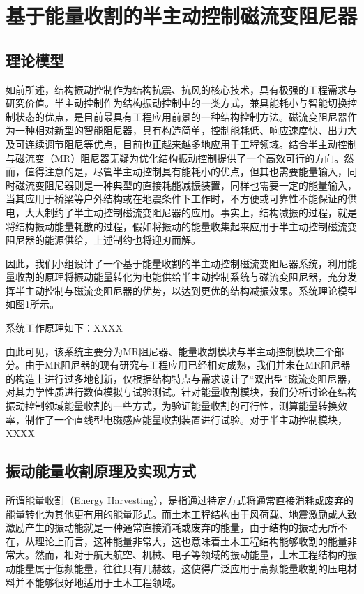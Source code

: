 \section{基于能量收割的半主动控制磁流变阻尼器}
\subsection{理论模型}
如前所述，结构振动控制作为结构抗震、抗风的核心技术，具有极强的工程需求与研究价值。半主动控制作为结构振动控制中的一类方式，兼具能耗小与智能切换控制状态的优点，是目前最具有工程应用前景的一种结构控制方法。磁流变阻尼器作为一种相对新型的智能阻尼器，具有构造简单，控制能耗低、响应速度快、出力大及可连续调节阻尼等优点，目前也正越来越多地应用于工程领域。结合半主动控制与磁流变（MR）阻尼器无疑为优化结构振动控制提供了一个高效可行的方向。然而，值得注意的是，尽管半主动控制具有能耗小的优点，但其也需要能量输入，同时磁流变阻尼器则是一种典型的直接耗能减振装置，同样也需要一定的能量输入，当其应用于桥梁等户外结构或在地震条件下工作时，不方便或可靠性不能保证的供电，大大制约了半主动控制磁流变阻尼器的应用。事实上，结构减振的过程，就是将结构振动能量耗散的过程，假如将振动的能量收集起来应用于半主动控制磁流变阻尼器的能源供给，上述制约也将迎刃而解。

因此，我们小组设计了一个基于能量收割的半主动控制磁流变阻尼器系统，利用能量收割的原理将振动能量转化为电能供给半主动控制系统与磁流变阻尼器，充分发挥半主动控制与磁流变阻尼器的优势，以达到更优的结构减振效果。系统理论模型如图\ref{system}所示。

\begin{figure}[H]
\label{system}
\end{figure}

系统工作原理如下：XXXX

由此可见，该系统主要分为MR阻尼器、能量收割模块与半主动控制模块三个部分。由于MR阻尼器的现有研究与工程应用已经相对成熟，我们并未在MR阻尼器的构造上进行过多地创新，仅根据结构特点与需求设计了“双出型”磁流变阻尼器，对其力学性质进行数值模拟与试验测试。针对能量收割模块，我们分析讨论在结构振动控制领域能量收割的一些方式，为验证能量收割的可行性，测算能量转换效率，制作了一个直线型电磁感应能量收割装置进行试验。对于半主动控制模块，XXXX

\subsection{振动能量收割原理及实现方式}

所谓能量收割（Energy Harvesting），是指通过特定方式将通常直接消耗或废弃的能量转化为其他更有用的能量形式。而土木工程结构由于风荷载、地震激励或人致激励产生的振动能就是一种通常直接消耗或废弃的能量，由于结构的振动无所不在，从理论上而言，这种能量非常大，这也意味着土木工程结构能够收割的能量非常大。然而，相对于航天航空、机械、电子等领域的振动能量，土木工程结构的振动能量属于低频能量，往往只有几赫兹，这使得广泛应用于高频能量收割的压电材料并不能够很好地适用于土木工程领域。

